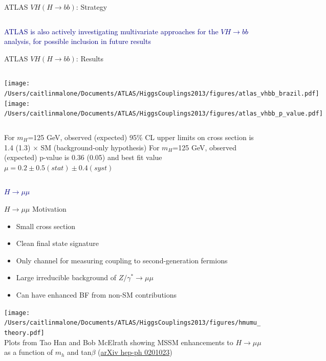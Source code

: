 \documentclass{beamer}
\begin{document}
\begin{frame}{ATLAS $VH (H\rightarrow bb)$: Strategy}
\begin{columns}[c]
	\end{columns}
	\scriptsize\textcolor{Navy}{ATLAS is also actively investigating multivariate approaches for the $VH\rightarrow bb$ analysis, for possible inclusion in future results}
\end{frame}



\begin{frame}{ATLAS $VH (H\rightarrow bb)$: Results}
	\begin{columns}
			\texttt{[image: /Users/caitlinmalone/Documents/ATLAS/HiggsCouplings2013/figures/atlas\_vhbb\_brazil.pdf]}
			\texttt{[image: /Users/caitlinmalone/Documents/ATLAS/HiggsCouplings2013/figures/atlas\_vhbb\_p\_value.pdf]}
	\end{columns}
		
	\begin{columns}[c]
		\column{0.5\textwidth}
			\scriptsize
			For $m_H$=125 GeV, observed (expected) 95\% CL upper limits on cross section is 1.4 (1.3) $\times$ SM (background-only hypothesis)
		\column{0.5\textwidth}
			\scriptsize
			For $m_H$=125 GeV, observed (expected) p-value is 0.36 (0.05) and best fit value $\mu=0.2\pm0.5(stat)\pm0.4(syst)$
	\end{columns}
\end{frame}





\begin{frame}[c]
	\begin{center}
	\huge \textcolor{Navy}{$H\rightarrow \mu\mu$}
	\end{center}
\end{frame}




\begin{frame}{$H\rightarrow\mu \mu$ Motivation}
		\begin{itemize} \scriptsize
			\item Small cross section
			\item Clean final state signature
			\item Only channel for measuring coupling to second-generation fermions
			\item Large irreducible background of $Z/\gamma^*\rightarrow\mu\mu$
			\item Can have enhanced BF from non-SM contributions
		\end{itemize}
			\texttt{[image: /Users/caitlinmalone/Documents/ATLAS/HiggsCouplings2013/figures/hmumu\_theory.pdf]}\\
			\scriptsize
			Plots from Tao Han and Bob McElrath showing MSSM enhancements to $H\rightarrow\mu\mu$ as a function of $m_h$ and tan$\beta$ (\href{http://arxiv.org/abs/hep-ph/0201023}{arXiv hep-ph 0201023})
\end{frame}
\end{document}
